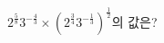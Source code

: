 $2^{\frac{5}{8}}3^{-\frac{4}{3}}\times\left(2^{\frac{3}{4}}3^{-\frac{1}{3}}\right)^{\frac{1}{2}}$의 값은?
